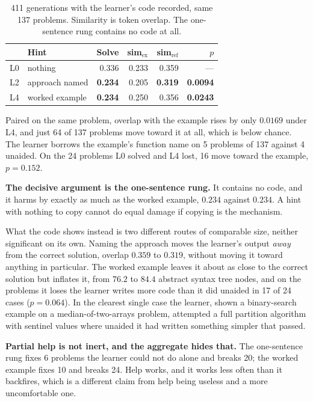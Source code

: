 \begin{table}[t]
\caption{411 generations with the learner's code recorded, same 137 problems.
Similarity is token overlap. The one-sentence rung contains no code at all.}
\label{tab:anchor}
\centering
\small
\begin{tabular}{llrrrr}
\toprule
 & \textbf{Hint} & \textbf{Solve} & \textbf{sim}$_{\text{ex}}$ &
 \textbf{sim}$_{\text{ref}}$ & \textbf{$p$} \\
\midrule
L0 & nothing           & 0.336 & 0.233 & 0.359 & --- \\
L2 & approach named    & \textbf{0.234} & 0.205 & \textbf{0.319} & \textbf{0.0094} \\
L4 & worked example    & \textbf{0.234} & 0.250 & 0.356 & \textbf{0.0243} \\
\bottomrule
\end{tabular}
\end{table}

Paired on the same problem, overlap with the example rises by only $0.0169$
under L4, and just 64 of 137 problems move toward it at all, which is below
chance. The learner borrows the example's function name on 5 problems of 137
against 4 unaided. On the 24 problems L0 solved and L4 lost, 16 move toward the
example, $p{=}0.152$.

\textbf{The decisive argument is the one-sentence rung.} It contains no code,
and it harms by exactly as much as the worked example, $0.234$ against
$0.234$. A hint with nothing to copy cannot do equal damage if copying is the
mechanism.

What the code shows instead is two different routes of comparable size, neither
significant on its own. Naming the approach moves the learner's output
\emph{away} from the correct solution, overlap $0.359$ to $0.319$, without
moving it toward anything in particular. The worked example leaves it about as
close to the correct solution but inflates it, from $76.2$ to $84.4$ abstract
syntax tree nodes, and on the problems it loses the learner writes more code
than it did unaided in 17 of 24 cases ($p{=}0.064$). In the clearest single
case the learner, shown a binary-search example on a median-of-two-arrays
problem, attempted a full partition algorithm with sentinel values where
unaided it had written something simpler that passed.

\textbf{Partial help is not inert, and the aggregate hides that.} The
one-sentence rung fixes 6 problems the learner could not do alone and breaks
20; the worked example fixes 10 and breaks 24. Help works, and it works less
often than it backfires, which is a different claim from help being useless and
a more uncomfortable one.

